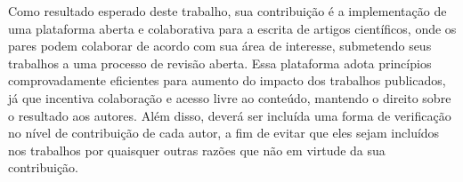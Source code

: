 Como resultado esperado deste trabalho, sua contribuição é a implementação de uma plataforma aberta e colaborativa para a escrita de artigos científicos, onde os pares podem colaborar de acordo com sua área de interesse, submetendo seus trabalhos a uma processo de revisão aberta. Essa plataforma adota princípios comprovadamente eficientes para aumento do impacto dos trabalhos publicados, já que incentiva colaboração e acesso livre ao conteúdo, mantendo o direito sobre o resultado aos autores. Além disso, deverá ser incluída uma forma de verificação no nível de contribuição de cada autor, a fim de evitar que eles sejam incluídos nos trabalhos por quaisquer outras razões \cite{Stealing1993} que não em virtude da sua contribuição.
